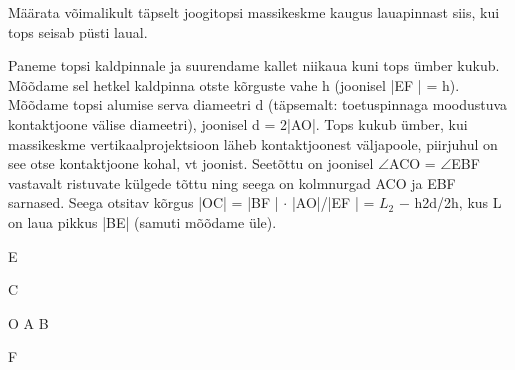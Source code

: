 
Määrata võimalikult täpselt joogitopsi massikeskme kaugus lauapinnast siis, kui tops seisab püsti laual.

\hint

\solu
Paneme topsi kaldpinnale ja suurendame kallet niikaua kuni tops ümber kukub. Mõõdame sel hetkel kaldpinna otste kõrguste vahe h (joonisel |EF | = h). Mõõdame topsi alumise serva diameetri d (täpsemalt: toetuspinnaga moodustuva kontaktjoone välise diameetri), joonisel d = 2|AO|. Tops kukub ümber, kui massikeskme vertikaalprojektsioon läheb kontaktjoonest väljapoole, piirjuhul on see otse kontaktjoone kohal, vt joonist. Seetõttu on joonisel $\angle$ACO = $\angle$EBF vastavalt ristuvate külgede tõttu ning seega on kolmnurgad ACO ja EBF sarnased. Seega otsitav kõrgus |OC| = |BF | $\cdot$ |AO|/|EF | = $L_2$ $-$ h2d/2h, kus L on laua pikkus |BE| (samuti mõõdame üle).

E

C

O A B

F
\probend
